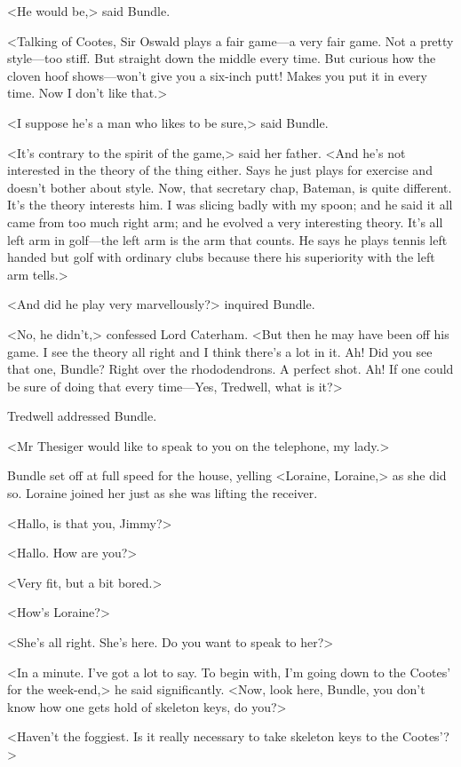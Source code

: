 <He would be,> said Bundle.

<Talking of Cootes, Sir Oswald plays a fair game—a very fair game. Not a pretty style—too stiff. But straight down the middle every time. But curious how the cloven hoof shows—won't give you a six-inch putt! Makes you put it in every time. Now I don't like that.>

<I suppose he's a man who likes to be sure,> said Bundle.

<It's contrary to the spirit of the game,> said her father. <And he's not interested in the theory of the thing either. Says he just plays for exercise and doesn't bother about style. Now, that secretary chap, Bateman, is quite different. It's the theory interests him. I was slicing badly with my spoon; and he said it all came from too much right arm; and he evolved a very interesting theory. It's all left arm in golf—the left arm is the arm that counts. He says he plays tennis left handed but golf with ordinary clubs because there his superiority with the left arm tells.>

<And did he play very marvellously?> inquired Bundle.

<No, he didn't,> confessed Lord Caterham. <But then he may have been off his game. I see the theory all right and I think there's a lot in it. Ah! Did you see that one, Bundle? Right over the rhododendrons. A perfect shot. Ah! If one could be sure of doing that every time—Yes, Tredwell, what is it?>

Tredwell addressed Bundle.

<Mr Thesiger would like to speak to you on the telephone, my lady.>

Bundle set off at full speed for the house, yelling <Loraine, Loraine,> as she did so. Loraine joined her just as she was lifting the receiver.

<Hallo, is that you, Jimmy?>

<Hallo. How are you?>

<Very fit, but a bit bored.>

<How's Loraine?>

<She's all right. She's here. Do you want to speak to her?>

<In a minute. I've got a lot to say. To begin with, I'm going down to the Cootes' for the week-end,> he said significantly. <Now, look here, Bundle, you don't know how one gets hold of skeleton keys, do you?>

<Haven't the foggiest. Is it really necessary to take skeleton keys to the Cootes'?>

